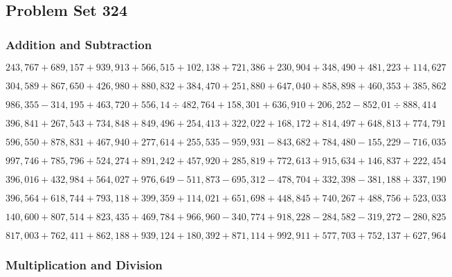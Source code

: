 \hypertarget{problem-set-324}{%
\subsection{Problem Set 324}\label{problem-set-324}}

\hypertarget{addition-and-subtraction}{%
\subsubsection{Addition and
Subtraction}\label{addition-and-subtraction}}

\(243,767+689,157+939,913+566,515+102,138+721,386+230,904+348,490+481,223+114,627\)

\(304,589+867,650+426,980+880,832+384,470+251,880+647,040+858,898+460,353+385,862\)

\(986,355-314,195+463,720+556,14÷482,764+158,301+636,910+206,252-852,01÷888,414\)

\(396,841+267,543+734,848+849,496+254,413+322,022+168,172+814,497+648,813+774,791\)

\(596,550+878,831+467,940+277,614+255,535-959,931-843,682+784,480-155,229-716,035\)

\(997,746+785,796+524,274+891,242+457,920+285,819+772,613+915,634+146,837+222,454\)

\(396,016+432,984+564,027+976,649-511,873-695,312-478,704+332,398-381,188+337,190\)

\(396,564+618,744+793,118+399,359+114,021+651,698+448,845+740,267+488,756+523,033\)

\(140,600+807,514+823,435+469,784+966,960-340,774+918,228-284,582-319,272-280,825\)

\(817,003+762,411+862,188+939,124+180,392+871,114+992,911+577,703+752,137+627,964\)

\hypertarget{multiplication-and-division}{%
\subsubsection{Multiplication and
Division}\label{multiplication-and-division}}

